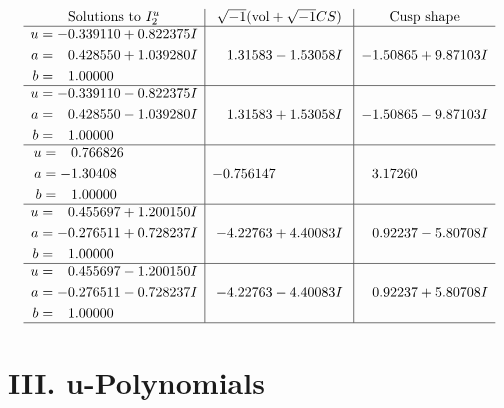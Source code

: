 \documentclass[1p]{elsarticle_modified}
\theoremstyle{definition}
\newcommand{\I}{\sqrt{-1}}
\begin{document}
$$\begin{array}{c|c|c}  
\text{Solutions to }I^u_{2}& \I (\text{vol} + \sqrt{-1}CS) & \text{Cusp shape}\\
 \hline 
\begin{aligned}
u &= -0.339110 + 0.822375 I \\
a &= \phantom{-}0.428550 + 1.039280 I \\
b &= \phantom{-}1.00000\phantom{ +0.000000I}\end{aligned}
 & \phantom{-}1.31583 - 1.53058 I & -1.50865 + 9.87103 I \\ \hline\begin{aligned}
u &= -0.339110 - 0.822375 I \\
a &= \phantom{-}0.428550 - 1.039280 I \\
b &= \phantom{-}1.00000\phantom{ +0.000000I}\end{aligned}
 & \phantom{-}1.31583 + 1.53058 I & -1.50865 - 9.87103 I \\ \hline\begin{aligned}
u &= \phantom{-}0.766826\phantom{ +0.000000I} \\
a &= -1.30408\phantom{ +0.000000I} \\
b &= \phantom{-}1.00000\phantom{ +0.000000I}\end{aligned}
 & -0.756147\phantom{ +0.000000I} & \phantom{-}3.17260\phantom{ +0.000000I} \\ \hline\begin{aligned}
u &= \phantom{-}0.455697 + 1.200150 I \\
a &= -0.276511 + 0.728237 I \\
b &= \phantom{-}1.00000\phantom{ +0.000000I}\end{aligned}
 & -4.22763 + 4.40083 I & \phantom{-}0.92237 - 5.80708 I \\ \hline\begin{aligned}
u &= \phantom{-}0.455697 - 1.200150 I \\
a &= -0.276511 - 0.728237 I \\
b &= \phantom{-}1.00000\phantom{ +0.000000I}\end{aligned}
 & -4.22763 - 4.40083 I & \phantom{-}0.92237 + 5.80708 I\\
 \hline 
 \end{array}$$\newpage
\newpage\renewcommand{\arraystretch}{1}
\centering \section*{ III. u-Polynomials}
\end{document}
